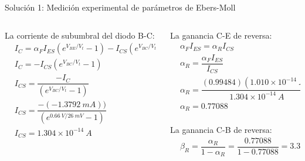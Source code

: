 \documentclass[t,aspectratio=169]{beamer}
\begin{document}
\begin{frame}{Solución 1: Medición experimental de parámetros de Ebers-Moll}

\begin{columns}
\begin{column}{0.5\textwidth}

La corriente de subumbral del diodo B-C:
%
\begin{align*}
& I_C = \alpha_F I_{ES} (e^{V_{BE}/V_t} - 1) - I_{CS} (e^{V_{BC}/V_t} - 1) \\
& I_C = - I_{CS} (e^{V_{BC}/V_t} - 1) \\
& I_{CS} = \dfrac{-I_C}{(e^{V_{BC}/V_t} - 1)} \\
& I_{CS} = \dfrac{-(-1.3792\ mA))}{(e^{0.66\ V/26\ mV} - 1)} \\
& I_{CS} = 1.304\times{}10^{-14}\ A \\
\end{align*}

\end{column}
\begin{column}{0.5\textwidth}

La ganancia C-E de reversa:
%
\begin{align*}
& \alpha_F I_{ES} = \alpha_R I_{CS} \\
& \alpha_R = \dfrac{\alpha_F I_{ES}}{I_{CS}} \\
& \alpha_R = \dfrac{(0.99484)(1.010\times{}10^{-14}\ A)}{1.304\times{}10^{-14}\ A} \\
& \alpha_R = 0.77088 \\
\end{align*}

La ganancia C-B de reversa:
%
\begin{align*}
& \beta_R = \dfrac{\alpha_R}{1 - \alpha_R} = \dfrac{0.77088}{1 - 0.77088} = 3.36453 \\
\end{align*}


\end{column}
\end{columns}

\end{frame}
\end{document}
